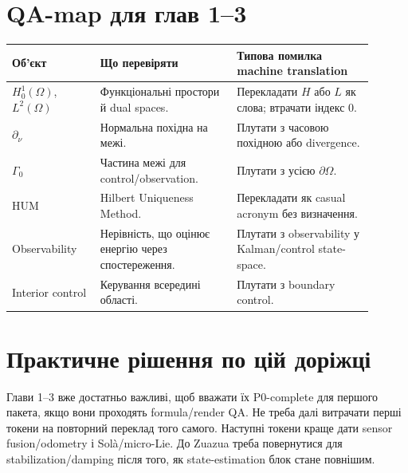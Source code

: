 \section*{QA-map для глав 1--3}

\begin{longtable}{L{0.22\linewidth}L{0.34\linewidth}L{0.34\linewidth}}
\toprule
Об'єкт & Що перевіряти & Типова помилка machine translation \\
\midrule
$H_0^1(\Omega)$, $L^2(\Omega)$ & Функціональні простори й dual spaces. & Перекладати $H$ або $L$ як слова; втрачати індекс $0$. \\
$\partial_\nu$ & Нормальна похідна на межі. & Плутати з часовою похідною або divergence. \\
$\Gamma_0$ & Частина межі для control/observation. & Плутати з усією $\partial\Omega$. \\
HUM & Hilbert Uniqueness Method. & Перекладати як casual acronym без визначення. \\
Observability & Нерівність, що оцінює енергію через спостереження. & Плутати з observability у Kalman/control state-space. \\
Interior control & Керування всередині області. & Плутати з boundary control. \\
\bottomrule
\end{longtable}

\section*{Практичне рішення по цій доріжці}

Глави 1--3 вже достатньо важливі, щоб вважати їх P0-complete для першого пакета, якщо вони проходять formula/render QA. Не треба далі витрачати перші токени на повторний переклад того самого. Наступні токени краще дати sensor fusion/odometry і Solà/micro-Lie. До Zuazua треба повернутися для stabilization/damping після того, як state-estimation блок стане повнішим.
